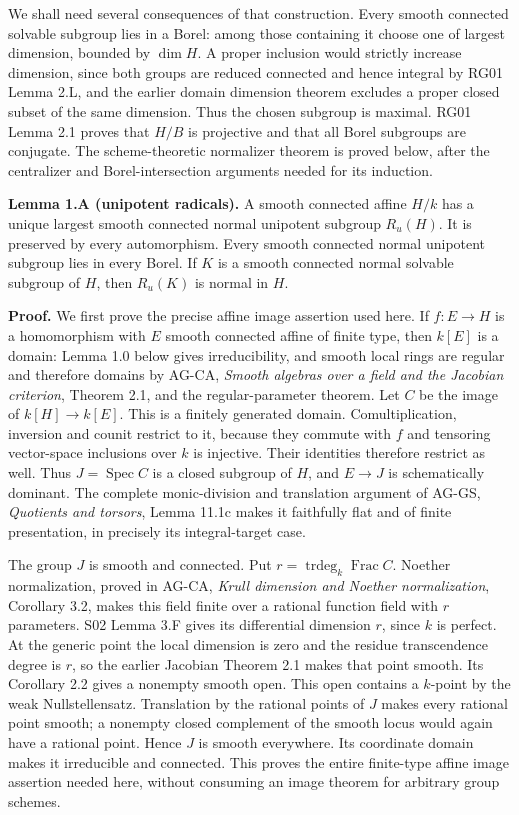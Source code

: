\documentclass[11pt,a4paper,openany]{report}
\newcounter{none}
\begin{document}
We shall need several consequences of that construction. Every smooth connected solvable subgroup lies in a Borel: among those containing it choose one of largest dimension, bounded by \(\dim H\). A proper inclusion would strictly increase dimension, since both groups are reduced connected and hence integral by RG01 Lemma 2.L, and the earlier domain dimension theorem excludes a proper closed subset of the same dimension. Thus the chosen subgroup is maximal. RG01 Lemma 2.1 proves that \(H/B\) is projective and that all Borel subgroups are conjugate. The scheme-theoretic normalizer theorem is proved below, after the centralizer and Borel-intersection arguments needed for its induction.

\textbf{Lemma 1.A (unipotent radicals).} A smooth connected affine \(H/k\) has a unique largest smooth connected normal unipotent subgroup \(R_u(H)\). It is preserved by every automorphism. Every smooth connected normal unipotent subgroup lies in every Borel. If \(K\) is a smooth connected normal solvable subgroup of \(H\), then \(R_u(K)\) is normal in \(H\).

\textbf{Proof.} We first prove the precise affine image assertion used here. If \(f:E\to H\) is a homomorphism with \(E\) smooth connected affine of finite type, then \(k[E]\) is a domain: Lemma 1.0 below gives irreducibility, and smooth local rings are regular and therefore domains by AG-CA, \emph{Smooth algebras over a field and the Jacobian criterion}, Theorem 2.1, and the regular-parameter theorem. Let \(C\) be the image of \(k[H]\to k[E]\). This is a finitely generated domain. Comultiplication, inversion and counit restrict to it, because they commute with \(f\) and tensoring vector-space inclusions over \(k\) is injective. Their identities therefore restrict as well. Thus \(J=\operatorname{Spec}C\) is a closed subgroup of \(H\), and \(E\to J\) is schematically dominant. The complete monic-division and translation argument of AG-GS, \emph{Quotients and torsors}, Lemma 11.1c makes it faithfully flat and of finite presentation, in precisely its integral-target case.

The group \(J\) is smooth and connected. Put \(r=\operatorname{trdeg}_k\operatorname{Frac}C\). Noether normalization, proved in AG-CA, \emph{Krull dimension and Noether normalization}, Corollary 3.2, makes this field finite over a rational function field with \(r\) parameters. S02 Lemma 3.F gives its differential dimension \(r\), since \(k\) is perfect. At the generic point the local dimension is zero and the residue transcendence degree is \(r\), so the earlier Jacobian Theorem 2.1 makes that point smooth. Its Corollary 2.2 gives a nonempty smooth open. This open contains a \(k\)-point by the weak Nullstellensatz. Translation by the rational points of \(J\) makes every rational point smooth; a nonempty closed complement of the smooth locus would again have a rational point. Hence \(J\) is smooth everywhere. Its coordinate domain makes it irreducible and connected. This proves the entire finite-type affine image assertion needed here, without consuming an image theorem for arbitrary group schemes.
\end{document}
